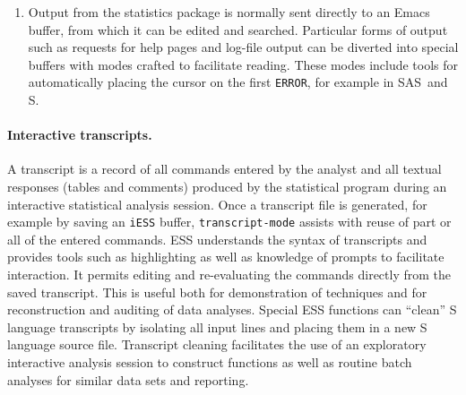 \documentclass{article}
\newcommand*{\SAS}{\textsc{SAS}}
\newcommand{\stexttt}[1]{{\small\texttt{#1}}}
\begin{document}
\begin{enumerate}
\item Output from the statistics package is normally sent directly to
  an Emacs buffer, from which it can be edited and searched.
  Particular forms of output such as requests for help pages and
  log-file output can be diverted into special buffers with modes
  crafted to facilitate reading.   These modes include tools for 
  automatically placing the cursor on the first \stexttt{ERROR},
  for example in \SAS\ and S. %


\end{enumerate}

\paragraph{Interactive transcripts.}
A transcript is a record of all commands entered by the analyst and
all textual responses (tables and comments) produced by the
statistical program during an interactive statistical analysis
session.  Once a transcript file is generated, for example by saving
an \stexttt{iESS} buffer, \stexttt{transcript-mode} assists with reuse
of part or all of the entered commands.  ESS understands the syntax of
transcripts and provides tools such as highlighting as well as
knowledge of prompts to facilitate interaction.  It permits editing
and re-evaluating the commands directly from the saved transcript.
This is useful both for demonstration of techniques and for
reconstruction and auditing of data analyses.  Special ESS functions
can ``clean'' S language transcripts by isolating all input lines and
placing them in a new S language source file.  Transcript cleaning
facilitates the use of an exploratory interactive analysis session to
construct functions as well as routine batch analyses for similar data
sets and reporting.
\end{document}
